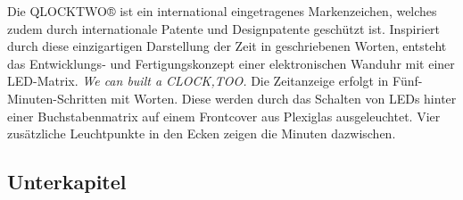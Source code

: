 \begin{multicols}{2}
Die QLOCKTWO® ist ein international eingetragenes Markenzeichen, welches zudem durch internationale Patente und Designpatente geschützt ist. Inspiriert durch diese einzigartigen Darstellung der Zeit in geschriebenen Worten, entsteht das Entwicklungs- und Fertigungskonzept einer elektronischen Wanduhr mit einer LED-Matrix. \textit{We can built a CLOCK,TOO.}
%
Die Zeitanzeige erfolgt in Fünf-Minuten-Schritten mit Worten. Diese werden durch das Schalten von LEDs hinter einer Buchstabenmatrix auf einem Frontcover aus Plexiglas ausgeleuchtet. Vier zusätzliche Leuchtpunkte in den Ecken zeigen die Minuten dazwischen.
\end{multicols}





\subsection{Unterkapitel}

